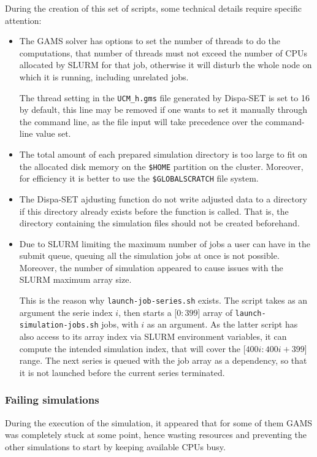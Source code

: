 During the creation of this set of scripts, some technical details require specific attention:
\begin{itemize}
    \item The GAMS solver has options to set the number of threads to do the computations, that number of threads must not exceed the number of CPUs allocated by SLURM for that job, otherwise it will disturb the whole node on which it is running, including unrelated jobs.
    
    The thread setting in the \texttt{UCM\_h.gms} file generated by Dispa-SET is set to 16 by default, this line may be removed if one wants to set it manually through the command line, as the file input will take precedence over the command-line value set.
    \item The total amount of each prepared simulation directory is too large to fit on the allocated disk memory on the \texttt{\$HOME} partition on the cluster. Moreover, for efficiency it is better to use the \texttt{\$GLOBALSCRATCH} file system.
    \item The Dispa-SET ajdusting function do not write adjusted data to a directory if this directory already exists before the function is called. That is, the directory containing the simulation files should not be created beforehand.
    \item Due to SLURM limiting the maximum number of jobs a user can have in the submit queue, queuing all the simulation jobs at once is not possible. Moreover, the number of simulation appeared to cause issues with the SLURM maximum array size.

    This is the reason why \texttt{launch-job-series.sh} exists. The script takes as an argument the serie index $i$, then starts a [$0:399$] array of \texttt{launch-simulation-jobs.sh} jobs, with $i$ as an argument. As the latter script has also access to its array index via SLURM environment variables, it can compute the intended simulation index, that will cover the [$400i:400i+399$] range. The next series is queued with the job array as a dependency, so that it is not launched before the current series terminated.
\end{itemize}

\subsubsection{Failing simulations}

During the execution of the simulation, it appeared that for some of them GAMS was completely stuck at some point, hence wasting resources and preventing the other simulations to start by keeping available CPUs busy.

